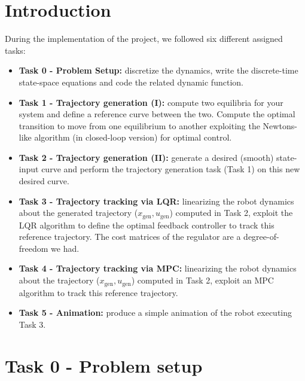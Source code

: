 \documentclass[a4paper,11pt,oneside]{book}
\begin{document}
\chapter*{Introduction}
\begin{flushleft}
    {During the implementation of the project, we followed six different assigned tasks:}
\end{flushleft}
\begin{itemize}
    \item \textbf{Task 0 - Problem Setup:} discretize the dynamics, write the discrete-time state-space equations and code the related dynamic function.
    
    \item \textbf{Task 1 - Trajectory generation (I):} compute two equilibria for your system and define a reference curve between the two. Compute the optimal transition to move from one equilibrium to another exploiting the Newton\textquotesingle s-like algorithm (in closed-loop version) for optimal control.
    
    \item \textbf{Task 2 - Trajectory generation (II):} generate a desired (smooth) state-input curve and perform the trajectory generation task (Task 1) on this new desired curve.
    
    \item \textbf{Task 3 - Trajectory tracking via LQR:} linearizing the robot dynamics about the generated trajectory (\(x_{\text{gen}}, u_{\text{gen}}\)) computed in Task 2, exploit the LQR algorithm to define the optimal feedback controller to track this reference trajectory. The cost matrices of the regulator are a degree-of-freedom we had.
    
    \item \textbf{Task 4 - Trajectory tracking via MPC:} linearizing the robot dynamics about the trajectory (\(x_{\text{gen}}, u_{\text{gen}}\)) computed in Task 2, exploit an MPC algorithm to track this reference trajectory.
    
    \item \textbf{Task 5 - Animation:} produce a simple animation of the robot executing Task 3.
\end{itemize}




\chapter{Task 0 - Problem setup}
\end{document}
